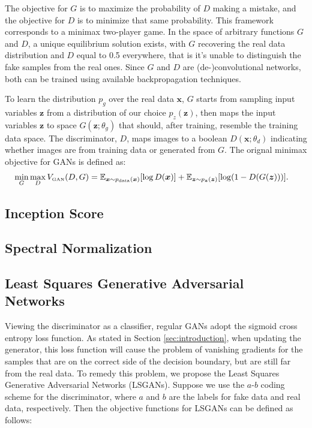 The objective for $G$ is to maximize the probability of $D$ making a mistake, and the objective for $D$ is to minimize that same probability. This framework corresponds to a minimax two-player game. In the space of arbitrary functions $G$ and $D$, a unique equilibrium solution exists, with $G$ recovering the real data distribution and $D$ equal to 0.5 everywhere, that is it's unable to distinguish the fake samples from the real ones. Since $G$ and $D$ are (de-)convolutional networks, both can be trained using available backpropagation techniques.

To learn the distribution $p_g$ over the real data $\bm{x}$, $G$ starts from sampling input variables $\bm{z}$ from a distribution of our choice $p_z(\bm{z})$, then maps the input variables $\bm{z}$ to space $G(\bm{z}; \theta_g)$ that should, after training, resemble the training data space. The discriminator, $D$, maps images to a boolean $D(\bm{x}; \theta_d)$ indicating whether images are from training data or generated from $G$. The orignal minimax objective for GANs is defined as:
\begin{equation}
\label{eq_gan}
\begin{split}
\min_G \max_D V_{\text{\tiny GAN}}(D, G) = \mathbb{E}_{\bm{x} \sim p_{\text{data}}(\bm{x})}[\log D(\bm{x})] + \mathbb{E}_{\bm{z} \sim p_{\bm{z}}(\bm{z})}[\log (1 - D(G(\bm{z})))]&.
\end{split}
\end{equation}


\subsection{Inception Score}

\subsection{Spectral Normalization}



\subsection{Least Squares Generative Adversarial Networks}

Viewing the discriminator as a classifier, regular GANs adopt the sigmoid cross entropy loss function. As stated in Section \ref{sec:introduction}, when updating the generator, this loss function will cause the problem of vanishing gradients for the samples that are on the correct side of the decision boundary, but are still far from the real data. To remedy this problem, we propose the Least Squares Generative Adversarial Networks (LSGANs). Suppose we use the $a$-$b$ coding scheme for the discriminator, where $a$ and $b$ are the labels for fake data and real data,  respectively. Then the objective functions for LSGANs can be defined as follows:

